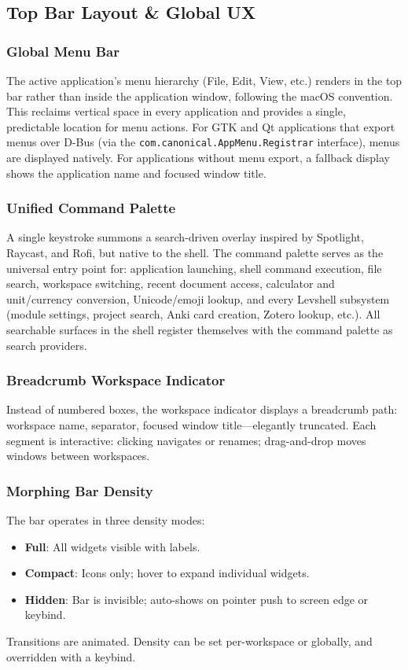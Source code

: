 \documentclass[11pt,a4paper]{article}
\begin{document}
\subsection{Top Bar Layout \& Global UX}
\label{sec:features-bar}

\subsubsection{Global Menu Bar}
The active application's menu hierarchy (File, Edit, View, etc.) renders in the top bar rather than inside the application window, following the macOS convention. This reclaims vertical space in every application and provides a single, predictable location for menu actions. For GTK and Qt applications that export menus over D-Bus (via the \texttt{com.canonical.AppMenu.Registrar} interface), menus are displayed natively. For applications without menu export, a fallback display shows the application name and focused window title.

\subsubsection{Unified Command Palette}
A single keystroke summons a search-driven overlay inspired by Spotlight, Raycast, and Rofi, but native to the shell. The command palette serves as the universal entry point for: application launching, shell command execution, file search, workspace switching, recent document access, calculator and unit/currency conversion, Unicode/emoji lookup, and every Levshell subsystem (module settings, project search, Anki card creation, Zotero lookup, etc.). All searchable surfaces in the shell register themselves with the command palette as search providers.

\subsubsection{Breadcrumb Workspace Indicator}
Instead of numbered boxes, the workspace indicator displays a breadcrumb path: workspace name, separator, focused window title---elegantly truncated. Each segment is interactive: clicking navigates or renames; drag-and-drop moves windows between workspaces.

\subsubsection{Morphing Bar Density}
The bar operates in three density modes:
\begin{itemize}[leftmargin=1.5em, itemsep=2pt]
  \item \textbf{Full}: All widgets visible with labels.
  \item \textbf{Compact}: Icons only; hover to expand individual widgets.
  \item \textbf{Hidden}: Bar is invisible; auto-shows on pointer push to screen edge or keybind.
\end{itemize}
Transitions are animated. Density can be set per-workspace or globally, and overridden with a keybind.
\end{document}
